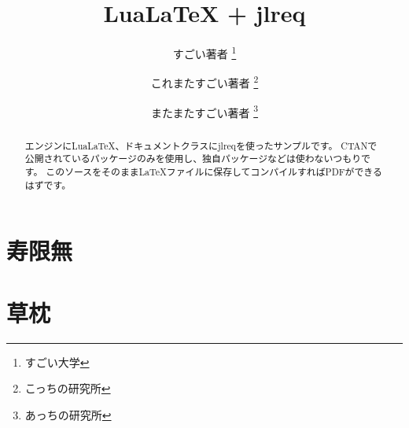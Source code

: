 \documentclass[article, head_space=25truemm, foot_space=25truemm, gutter=15truemm]{jlreq}
\title{LuaLaTeX + jlreq}
\author{
    すごい著者 \thanks{すごい大学} \\ \and
    これまたすごい著者 \thanks{こっちの研究所} \\ \and
    またまたすごい著者 \thanks{あっちの研究所}
}
\begin{document}
\maketitle

\begin{abstract}
エンジンにLuaLaTeX、ドキュメントクラスにjlreqを使ったサンプルです。
CTANで公開されているパッケージのみを使用し、独自パッケージなどは使わないつもりです。
このソースをそのままLaTeXファイルに保存してコンパイルすればPDFができるはずです。
\end{abstract}

\section{寿限無}


\section{草枕}


\newpage
\layout

\printbibliography[title={参考文献}]
\end{document}
